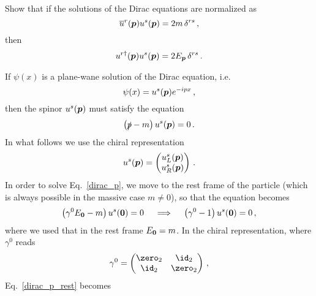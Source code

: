 \begin{ex} \label{ex_18} 
    Show that if the solutions of the Dirac equations are normalized as
    \begin{equation}
        \overline{u}^r(\boldsymbol{p}) u^s(\boldsymbol{p}) = 2m \, \delta^{rs} \,,
    \end{equation}
    then
    \begin{equation}
        u^{r \dagger}(\boldsymbol{p}) u^s(\boldsymbol{p}) = 2 E_{\boldsymbol{p}} \, \delta^{rs}\,.
    \end{equation}
\end{ex}

\begin{sol}
    If $\psi(x)$ is a plane-wane solution of the Dirac equation, i.e.
    \begin{equation}
        \psi(x) = u^s(\boldsymbol{p}) e^{-ipx} \,,
    \end{equation}
    then the spinor $u^s(\boldsymbol{p})$ must satisfy the equation
    \begin{equation}
    \label{dirac_p}
        \left( \slashed{p} - m\right)u^s(\boldsymbol{p}) = 0 \,.
    \end{equation}
    In what follows we use the chiral representation
    \begin{equation}
        u^s(\boldsymbol{p}) = 
        \begin{pmatrix}
            u_{L}^s(\boldsymbol{p}) \\
            u_{R}^s(\boldsymbol{p})
        \end{pmatrix}\,.
    \end{equation}
    In order to solve Eq.~\eqref{dirac_p}, we move to the rest frame of the particle (which is always possible in the massive case $m \neq 0$),
    so that the equation becomes
    \begin{equation}
    \label{dirac_p_rest}
        \left( \gamma^0 E_{\boldsymbol{0}} - m\right)u^s(\boldsymbol{0}) = 0  \quad \implies \quad \left( \gamma^0 - 1\right)u^s(\boldsymbol{0}) = 0 \, ,
    \end{equation}
    where we used that in the rest frame $E_{\boldsymbol{0}} = m$.
    In the chiral representation, where $\gamma^0$ reads
    \begin{equation}
        \gamma^0 =
        \begin{pmatrix}
            \zero_2 & \id_2 \\
            \id_2 & \zero_2 
        \end{pmatrix}\,,
    \end{equation}
    Eq.~\eqref{dirac_p_rest} becomes
    \begin{equation}

\end{equation}
\end{sol}
